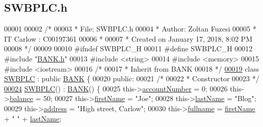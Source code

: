 \hypertarget{_s_w_b_p_l_c_8h_source}{}\subsection{S\+W\+B\+P\+L\+C.\+h}

\begin{DoxyCode}
00001 
00002 \textcolor{comment}{/* }
00003 \textcolor{comment}{ * File:   SWBPLC.h}
00004 \textcolor{comment}{ * Author: Zoltan Fuzesi}
00005 \textcolor{comment}{ * IT Carlow : C00197361}
00006 \textcolor{comment}{ *}
00007 \textcolor{comment}{ * Created on January 17, 2018, 8:02 PM}
00008 \textcolor{comment}{ */}
00009 
00010 \textcolor{preprocessor}{#ifndef SWBPLC\_H}
00011 \textcolor{preprocessor}{#define SWBPLC\_H}
00012 \textcolor{preprocessor}{#include "\hyperlink{_b_a_n_k_8h}{BANK.h}"}
00013 \textcolor{preprocessor}{#include <string>}
00014 \textcolor{preprocessor}{#include <memory>}
00015 \textcolor{preprocessor}{#include <iostream>}
00016 \textcolor{comment}{/*}
00017 \textcolor{comment}{ * Inherit from BANK}
00018 \textcolor{comment}{ */}
\hypertarget{_s_w_b_p_l_c_8h_source.tex_l00019}{}\hyperlink{class_s_w_b_p_l_c}{00019} \textcolor{keyword}{class }\hyperlink{class_s_w_b_p_l_c}{SWBPLC} : \textcolor{keyword}{public} \hyperlink{class_b_a_n_k}{BANK} \{
00020 \textcolor{keyword}{public}:
00021     \textcolor{comment}{/*}
00022 \textcolor{comment}{     * Constructor}
00023 \textcolor{comment}{     */}
\hypertarget{_s_w_b_p_l_c_8h_source.tex_l00024}{}\hyperlink{class_s_w_b_p_l_c_a320f4e2b023038668d941ce5d0c46aeb_a320f4e2b023038668d941ce5d0c46aeb}{00024}     \hyperlink{class_s_w_b_p_l_c_a320f4e2b023038668d941ce5d0c46aeb_a320f4e2b023038668d941ce5d0c46aeb}{SWBPLC}() : \hyperlink{class_b_a_n_k}{BANK}() \{
00025         this->\hyperlink{class_s_w_b_p_l_c_a5d03f989254b88bdb7eb3deeec7e4217_a5d03f989254b88bdb7eb3deeec7e4217}{accountNumber} = 0;
00026         this->\hyperlink{class_s_w_b_p_l_c_a34365efdc6dde37a4da9a6222dcde389_a34365efdc6dde37a4da9a6222dcde389}{balance} = 50;
00027         this->\hyperlink{class_s_w_b_p_l_c_a38fd4817afe4aaac4993b0b4c7074b9c_a38fd4817afe4aaac4993b0b4c7074b9c}{firstName} = \textcolor{stringliteral}{"Joe"};
00028         this->\hyperlink{class_s_w_b_p_l_c_aa06b2e569dd1fef8e43dfda1b34d67f3_aa06b2e569dd1fef8e43dfda1b34d67f3}{lastName} = \textcolor{stringliteral}{"Blog"};
00029         this->\hyperlink{class_s_w_b_p_l_c_a86edad3cbbc5903c8ab8a45b22c0dd15_a86edad3cbbc5903c8ab8a45b22c0dd15}{address} = \textcolor{stringliteral}{"High street, Carlow"};
00030         this->\hyperlink{class_s_w_b_p_l_c_a5de90ba5cac0107fa5361458a0df839e_a5de90ba5cac0107fa5361458a0df839e}{fullname} = \hyperlink{class_s_w_b_p_l_c_a38fd4817afe4aaac4993b0b4c7074b9c_a38fd4817afe4aaac4993b0b4c7074b9c}{firstName} + \textcolor{stringliteral}{" "} + \hyperlink{class_s_w_b_p_l_c_aa06b2e569dd1fef8e43dfda1b34d67f3_aa06b2e569dd1fef8e43dfda1b34d67f3}{lastName};

\end{DoxyCode}
